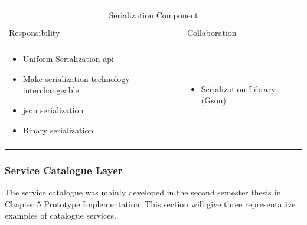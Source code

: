 \vspace{0.5cm} \noindent 
\begin{tabular}{|l|l|}
    \cline{1-2}
    \multicolumn{2}{|c|}{} \\[-0.3cm]
    \multicolumn{2}{|c|}{Serialization Component} \\ 
    \multicolumn{2}{|c|}{} \\[-0.3cm]
    \cline{1-2}
    Responsibility & Collaboration \\
    \cline{1-2}
    & \\[-0.2cm]
    \begin{minipage}{0.47\textwidth}
        \begin{itemize}
          \item Uniform Serialization \gls{api}
          \item Make serialization technology interchangeable
          \item \gls{json} serialization
          \item Binary serialization
        \end{itemize} 
    \end{minipage}
	&
    \begin{minipage}{0.47\textwidth}
        \begin{itemize}
          \item Serialization Library (Gson)
        \end{itemize} 
    \end{minipage}
	\\ & \\
    \hline
\end{tabular}

\subsubsection{Service Catalogue Layer}

The service catalogue was mainly developed in the second semester thesis
\cite{biedermann2016project2} in Chapter 5 Prototype Implementation.
This section will give three representative examples of catalogue services.\\

